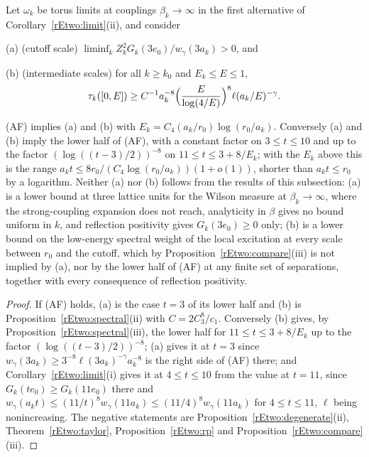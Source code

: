 \begin{corollary}\label{rEtwo:step}
Let $\omega_k$ be torus limits at couplings $\beta_k\to\infty$ in the first
alternative of Corollary~\textup{\ref{rEtwo:limit}(ii)}, and consider

\textup{(a)} \textup{(}cutoff scale\textup{)} $\liminf_kZ_k^2G_k(3e_0)/
w_\gamma(3a_k)>0$, and

\textup{(b)} \textup{(}intermediate scales\textup{)} for all $k\ge k_0$
and $E_k\le E\le1$,
\[
\tau_k([0,E])\ge C^{-1}a_k^{-8}\Bigl(\frac{E}{\log(4/E)}\Bigr)^8
\ell(a_k/E)^{-\gamma}.
\]

(AF) implies \textup{(a)} and \textup{(b)} with $E_k=
C_4(a_k/r_0)\log(r_0/a_k)$. Conversely \textup{(a)} and \textup{(b)} imply
the lower half of (AF), with a constant factor on $3\le t\le10$ and up to the factor $(\log((t-3)/2))^{-8}$ on $11\le t
\le3+8/E_k$; with the $E_k$ above this is the range $a_kt\le8r_0/(C_4\log(
r_0/a_k))(1+o(1))$, shorter than $a_kt\le r_0$ by a logarithm. Neither
\textup{(a)} nor \textup{(b)} follows from the results of this subsection:
\textup{(a)} is a lower bound at three lattice units for the Wilson
measure at $\beta_k\to\infty$, where the strong-coupling expansion does
not reach, analyticity in $\beta$ gives no bound uniform in $k$, and
reflection positivity gives $G_k(3e_0)\ge0$ only; \textup{(b)} is a lower
bound on the low-energy spectral weight of the local excitation at every
scale between $r_0$ and the cutoff, which by
Proposition~\ref{rEtwo:compare}(iii) is not implied by \textup{(a)}, nor by
the lower half of (AF) at any finite set of separations, together with
every consequence of reflection positivity.
\end{corollary}

\begin{proof}
If (AF) holds, (a) is the case $t=3$ of its lower half and (b) is
Proposition~\ref{rEtwo:spectral}(ii) with $C=2C_3^8/c_1$. Conversely (b)
gives, by Proposition~\ref{rEtwo:spectral}(iii), the lower half for $11\le
t\le3+8/E_k$ up to the factor $(\log((t-3)/2))^{-8}$; (a) gives it at
$t=3$ since $w_\gamma(3a_k)\ge3^{-8}\ell(3a_k)^{-\gamma}a_k^{-8}$ is the
right side of (AF) there; and Corollary~\ref{rEtwo:limit}(i) gives it at
$4\le t\le10$ from the value at $t=11$, since $G_k(te_0)\ge G_k(11e_0)$
there and $w_\gamma(a_kt)\le(11/t)^8w_\gamma(11a_k)\le(11/4)^8w_\gamma(11a_k)$
for $4\le t\le11$, $\ell$ being nonincreasing. The negative statements are
Proposition~\ref{rEtwo:degenerate}(ii), Theorem~\ref{rEtwo:taylor},
Proposition~\ref{rEtwo:rp} and Proposition~\ref{rEtwo:compare}(iii).
\end{proof}

